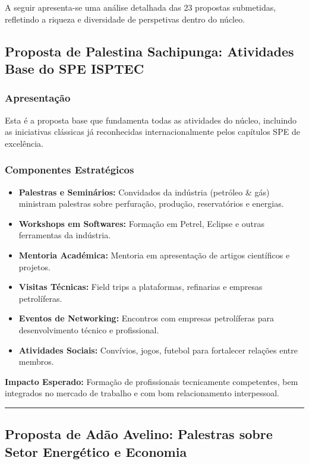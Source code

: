 \documentclass[12pt,a4paper]{article}
\newcommand{\proposalsep}{%
  \vspace{6pt}%
  {\color{gold}\rule{0.35\linewidth}{0.7pt}}%
  \vspace{4pt}%
}
\begin{document}
A seguir apresenta-se uma análise detalhada das 23 propostas submetidas, refletindo a riqueza e diversidade de perspetivas dentro do núcleo.

\subsection{Proposta de Palestina Sachipunga: Atividades Base do SPE ISPTEC}

\subsubsection*{Apresentação}
Esta é a proposta base que fundamenta todas as atividades do núcleo, incluindo as iniciativas clássicas já reconhecidas internacionalmente pelos capítulos SPE de excelência.

\subsubsection*{Componentes Estratégicos}

\begin{itemize}
    \item \textbf{Palestras e Seminários:} Convidados da indústria (petróleo \& gás) ministram palestras sobre perfuração, produção, reservatórios e energias.
    \item \textbf{Workshops em Softwares:} Formação em Petrel, Eclipse e outras ferramentas da indústria.
    \item \textbf{Mentoria Académica:} Mentoria em apresentação de artigos científicos e projetos.
    \item \textbf{Visitas Técnicas:} Field trips a plataformas, refinarias e empresas petrolíferas.
    \item \textbf{Eventos de Networking:} Encontros com empresas petrolíferas para desenvolvimento técnico e profissional.
    \item \textbf{Atividades Sociais:} Convívios, jogos, futebol para fortalecer relações entre membros.
\end{itemize}

\begin{infobox}
\small\textbf{Impacto Esperado:} Formação de profissionais tecnicamente competentes, bem integrados no mercado de trabalho e com bom relacionamento interpessoal.
\end{infobox}

\proposalsep

\subsection{Proposta de Adão Avelino: Palestras sobre Setor Energético e Economia}
\end{document}
